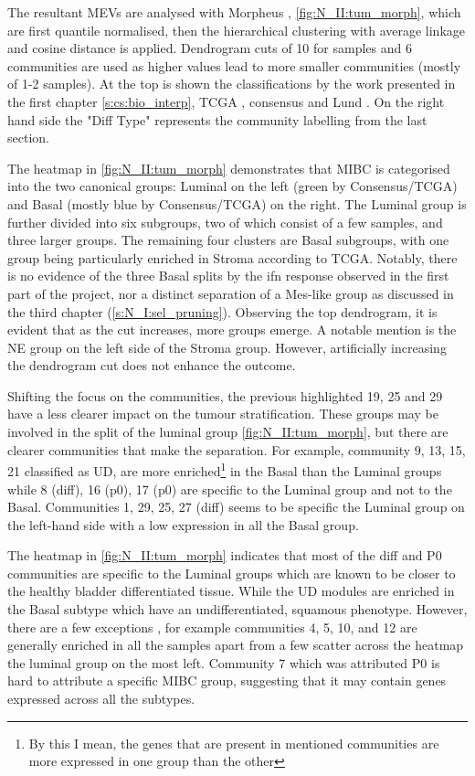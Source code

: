 The resultant MEVs are analysed with Morpheus \citet{Broad-InstituteUnknown-kn}, \cref{fig:N_II:tum_morph}, which are first quantile normalised, then the hierarchical clustering with average linkage and cosine distance is applied. Dendrogram cuts of 10 for samples and 6 communities are used as higher values lead to more smaller communities (mostly of 1-2 samples). At the top is shown the classifications by the work presented in the first chapter \cref{s:cs:bio_interp}, TCGA \citet{Robertson2017-mg}, consensus \citet{Kamoun2020-tj} and Lund \citet{Marzouka2018-ge}. On the right hand side the "Diff Type" represents the community labelling from the last section.

The heatmap in \cref{fig:N_II:tum_morph} demonstrates that MIBC is categorised into the two canonical groups: Luminal on the left (green by Consensus/TCGA) and Basal (mostly blue by Consensus/TCGA) on the right. The Luminal group is further divided into six subgroups, two of which consist of a few samples, and three larger groups. The remaining four clusters are Basal subgroups, with one group being particularly enriched in Stroma according to TCGA. Notably, there is no evidence of the three Basal splits by the \acrfull{ifn} response observed in the first part of the project, nor a distinct separation of a Mes-like group as discussed in the third chapter (\cref{s:N_I:sel_pruning}). Observing the top dendrogram, it is evident that as the cut increases, more groups emerge. A notable mention is the NE group on the left side of the Stroma group. However, artificially increasing the dendrogram cut does not enhance the outcome.

Shifting the focus on the communities, the previous highlighted 19, 25 and 29 have a less clearer impact on the tumour stratification. These groups may be involved in the split of the luminal group \cref{fig:N_II:tum_morph}, but there are clearer communities that make the separation. For example, community 9, 13, 15, 21 classified as UD, are more enriched\footnote{By this I mean, the genes that are present in mentioned communities are more expressed in one group than the other} in the Basal than the Luminal groups while 8 (diff), 16 (p0), 17 (p0) are specific to the Luminal group and not to the Basal. Communities 1, 29, 25, 27 (diff) seems to be specific the Luminal group on the left-hand side with a low expression in all the Basal group. 

The heatmap in \cref{fig:N_II:tum_morph} indicates that most of the diff and P0 communities are specific to the Luminal groups which are known to be closer to the healthy bladder differentiated tissue. While the UD modules are enriched in the Basal subtype which have an undifferentiated, squamous phenotype. However, there are a few exceptions , for example communities 4, 5, 10, and 12 are generally enriched in all the samples apart from a few scatter across the heatmap the luminal group on the most left. Community 7 which was attributed P0 is hard to attribute a specific MIBC group, suggesting that it may contain genes expressed across all the subtypes.

